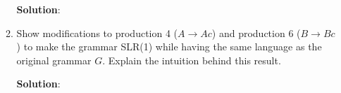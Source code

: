 \documentclass[11pt]{article}
\begin{document}
\begin{enumerate}
\begin{enumerate}
    \textbf{Solution}:

  \item Show modifications to production 4 ($A \to Ac$) and production 6 ($B \to Bc$) to make the grammar SLR(1) while having the same language as the original grammar $G$. Explain the intuition behind this result.

    \textbf{Solution}:
  \end{enumerate} 

\end{enumerate}
\end{document}

